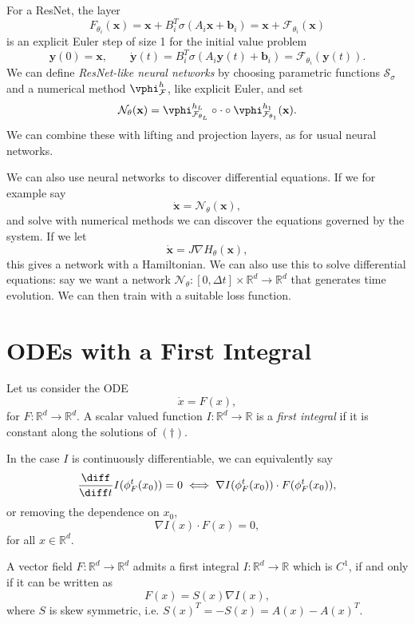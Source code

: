 \documentclass[12pt]{article}
\begin{document}
For a ResNet, the layer
\[
F_{\theta_i}(\mathbf{x}) = \mathbf{x} + B_i^{T} \sigma(A_i \mathbf{x} + \mathbf{b}_i) = \mathbf{x} + \mathcal{F}_{\theta_i}(\mathbf{x})
\]
is an explicit Euler step of size 1 for the initial value problem
\[
\mathbf{y}(0) = \mathbf{x}, \qquad \mathbf{\dot y}(t) = B_i^{T}\sigma(A_i \mathbf{y}(t) + \mathbf{b}_i) = \mathcal{F}_{\theta_i}(\mathbf{y}(t)).
\]
We can define \emph{ResNet-like neural networks} by choosing parametric functions $\mathcal{S}_\sigma$ and a numerical method $\vphi_{\mathcal{F}}^h$, like explicit Euler, and set
\[
\mathcal{N}_\theta(\mathbf{x}) = \vphi_{\mathcal{F}_{\theta_L}}^{h_L} \circ \cdot \circ \vphi_{\mathcal{F}_{\theta_1}}^{h_1}(\mathbf{x}).
\]
We can combine these with lifting and projection layers, as for usual neural networks.

We can also use neural networks to discover differential equations. If we for example say
\[
\mathbf{\dot x} = \mathcal{N}_{\theta}(\mathbf{x}),
\]
and solve with numerical methods we can discover the equations governed by the system. If we let
\[
\mathbf{\dot x} = J \nabla H_{\theta}(\mathbf{x}),
\]
this gives a network with a Hamiltonian. We can also use this to solve differential equations: say we want a network $\mathcal{N}_\theta : [0, \Delta t] \times \mathbb{R}^{d} \to \mathbb{R}^{d}$ that generates time evolution. We can then train with a suitable loss function.


\newpage

\section{ODEs with a First Integral}%
\label{sec:fi}

Let us consider the ODE
\[
	\dot x = F(x), \tag{$\dagger$}
\]
for $F : \mathbb{R}^{d} \to \mathbb{R}^{d}$. A scalar valued function $I : \mathbb{R}^{d} \to \mathbb{R}$ is a \emph{first integral} if it is constant along the solutions of $(\dagger)$.

In the case $I$ is continuously differentiable, we can equivalently say
\[
\frac{\diff}{\diff t} I (\phi_F^{t}(x_0)) = 0 \iff \nabla I(\phi_F^{t}(x_0)) \cdot F(\phi_F^{t}(x_0)),
\]
or removing the dependence on $x_0$,
\[
\nabla I(x) \cdot F(x) = 0,
\]
for all $x \in \mathbb{R}^{d}$.

A vector field $F : \mathbb{R}^{d} \to \mathbb{R}^{d}$ admits a first integral $I : \mathbb{R}^{d} \to \mathbb{R}$ which is $C^1$, if and only if it can be written as
\[
F(x) = S(x) \nabla I(x),
\]
where $S$ is skew symmetric, i.e. $S(x)^{T} = -S(x) = A(x) - A(x)^{T}$.
\end{document}
